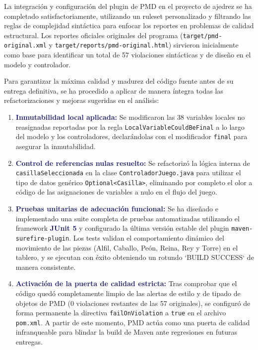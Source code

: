 \documentclass[12pt,a4paper]{article}
\newcommand{\key}[1]{\textbf{\textcolor{MidnightBlue}{#1}}}
\begin{document}
La integración y configuración del plugin de PMD en el proyecto de ajedrez se ha completado satisfactoriamente, utilizando un ruleset personalizado y filtrando las reglas de complejidad sintáctica para enfocar los reportes en problemas de calidad estructural. Los reportes oficiales originales del programa (\texttt{target/pmd-original.xml} y \texttt{target/reports/pmd-original.html}) sirvieron inicialmente como base para identificar un total de 57 violaciones sintácticas y de diseño en el modelo y controlador.

Para garantizar la máxima calidad y madurez del código fuente antes de su entrega definitiva, se ha procedido a aplicar de manera íntegra todas las refactorizaciones y mejoras sugeridas en el análisis:

\begin{notebox}
\begin{enumerate}[leftmargin=1.5em]
    \item \key{Inmutabilidad local aplicada:} Se modificaron las 38 variables locales no reasignadas reportadas por la regla \texttt{LocalVariableCouldBeFinal} a lo largo del modelo y los controladores, declarándolas con el modificador \texttt{final} para asegurar la inmutabilidad.
    \item \key{Control de referencias nulas resuelto:} Se refactorizó la lógica interna de \texttt{casillaSeleccionada} en la clase \texttt{ControladorJuego.java} para utilizar el tipo de datos genérico \texttt{Optional<Casilla>}, eliminando por completo el olor a código de las asignaciones de variables a nulo en el flujo del juego.
    \item \key{Pruebas unitarias de adecuación funcional:} Se ha diseñado e implementado una suite completa de pruebas automatizadas utilizando el framework \key{JUnit 5} y configurado la última versión estable del plugin \texttt{maven-surefire-plugin}. Los tests validan el comportamiento dinámico del movimiento de las piezas (Alfil, Caballo, Peón, Reina, Rey y Torre) en el tablero, y se ejecutan con éxito obteniendo un rotundo `BUILD SUCCESS` de manera consistente.
    \item \key{Activación de la puerta de calidad estricta:} Tras comprobar que el código quedó completamente limpio de las alertas de estilo y de tipado de objetos de PMD (0 violaciones restantes de las 57 originales), se configuró de forma permanente la directiva \texttt{failOnViolation} a \texttt{true} en el archivo \texttt{pom.xml}. A partir de este momento, PMD actúa como una puerta de calidad infranqueable para blindar la build de Maven ante regresiones en futuras entregas.
\end{enumerate}
\end{notebox}
\end{document}
